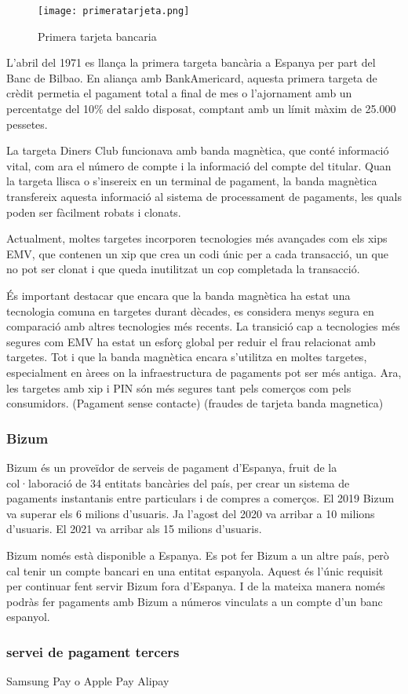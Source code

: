 \begin{figure}[h]
    \centering
    \texttt{[image: primeratarjeta.png]}
    \caption{Primera tarjeta bancaria}
\end{figure}  


L'abril del 1971 es llança la primera targeta bancària a Espanya per part del Banc de Bilbao. En aliança amb BankAmericard, aquesta primera targeta de crèdit permetia el pagament total a final de mes o l'ajornament amb un percentatge del 10\% del saldo disposat, comptant amb un límit màxim de 25.000 pessetes.


La targeta Diners Club funcionava amb banda magnètica, que conté informació vital, com ara el número de compte i la informació del compte del titular. Quan la targeta llisca o s'insereix en un terminal de pagament, la banda magnètica transfereix aquesta informació al sistema de processament de pagaments, les quals poden ser fàcilment robats i clonats. 

Actualment, moltes targetes incorporen tecnologies més avançades com els xips EMV, que contenen un xip que crea un codi únic per a cada transacció, un que no pot ser clonat i que queda inutilitzat un cop completada la transacció.

És important destacar que encara que la banda magnètica ha estat una tecnologia comuna en targetes durant dècades, es considera menys segura en comparació amb altres tecnologies més recents. La transició cap a tecnologies més segures com EMV ha estat un esforç global per reduir el frau relacionat amb targetes. Tot i que la banda magnètica encara s'utilitza en moltes targetes, especialment en àrees on la infraestructura de pagaments pot ser més antiga. Ara, les targetes amb xip i PIN són més segures tant pels comerços com pels consumidors.
(Pagament sense contacte)
(fraudes de tarjeta banda magnetica)


\subsubsection*{Bizum}


Bizum és un proveïdor de serveis de pagament d'Espanya, fruit de la col·laboració de 34 entitats bancàries del país, per crear un sistema de pagaments instantanis entre particulars i de compres a comerços. El 2019 Bizum va superar els 6 milions d'usuaris. Ja l'agost del 2020 va arribar a 10 milions d'usuaris. El 2021 va arribar als 15 milions d'usuaris.

Bizum només està disponible a Espanya. Es pot fer Bizum a un altre país, però cal tenir un compte bancari en una entitat espanyola. Aquest és l'únic requisit per continuar fent servir Bizum fora d'Espanya. I de la mateixa manera només podràs fer pagaments amb Bizum a números vinculats a un compte d'un banc espanyol.

\subsubsection*{servei de pagament tercers}

Samsung Pay o Apple Pay Alipay









